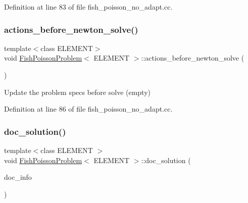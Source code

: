 Definition at line 83 of file fish\+\_\+poisson\+\_\+no\+\_\+adapt.\+cc.

\mbox{\label{classFishPoissonProblem_a4f3ddd6ae8117d36cace040a2cad68a3}} 
\subsubsection{\texorpdfstring{actions\+\_\+before\+\_\+newton\+\_\+solve()}{actions\_before\_newton\_solve()}}
{\footnotesize\ttfamily template$<$class E\+L\+E\+M\+E\+NT$>$ \\
void \hyperlink{classFishPoissonProblem}{Fish\+Poisson\+Problem}$<$ E\+L\+E\+M\+E\+NT $>$\+::actions\+\_\+before\+\_\+newton\+\_\+solve (\begin{DoxyParamCaption}{ }\end{DoxyParamCaption})\hspace{0.3cm}{\ttfamily [inline]}}



Update the problem specs before solve (empty) 



Definition at line 86 of file fish\+\_\+poisson\+\_\+no\+\_\+adapt.\+cc.

\mbox{\label{classFishPoissonProblem_a728ae67316d80029132b98b6a4e5ffe5}} 
\subsubsection{\texorpdfstring{doc\+\_\+solution()}{doc\_solution()}}
{\footnotesize\ttfamily template$<$class E\+L\+E\+M\+E\+NT $>$ \\
void \hyperlink{classFishPoissonProblem}{Fish\+Poisson\+Problem}$<$ E\+L\+E\+M\+E\+NT $>$\+::doc\+\_\+solution (\begin{DoxyParamCaption}\item[{Doc\+Info \&}]{doc\+\_\+info }\end{DoxyParamCaption})}



